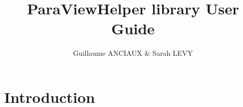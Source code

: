 \documentclass[10pt]{report}
\title{
\vspace{-4cm}
ParaViewHelper library User Guide}
\author{Guillaume ANCIAUX \& Sarah LEVY}
\begin{document}
\maketitle
\chapter{Introduction}


\end{document}
